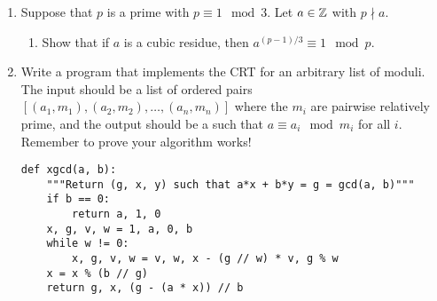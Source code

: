 \documentclass[10pt]{article}
\begin{document}
\begin{enumerate}[itemsep=1em,label=\Alph*.,leftmargin=*]
            \pagebreak
    \item  Suppose that $p$ is a prime with $p \equiv 1 \mod{3}$. Let $a \in \mathbb{Z}$ with $p \nmid a$.
        \begin{enumerate}[label=(\alph*),leftmargin=*]
            \item Show that if $a$ is a cubic residue, then $a^{(p−1)/3} \equiv 1 \mod{p}$. 

            
        
        \end{enumerate}

            \pagebreak
    \item Write a program that implements the CRT for an arbitrary list of moduli.
The input should be a list of ordered pairs $[(a_1,m_1),(a_2,m_2),\ldots,(a_n,m_n)]$
where the $m_i$ are pairwise relatively prime, and the output should be a
        such that $a \equiv a_i \mod{m_i}$ for all $i$. Remember to prove your algorithm works!
\vspace{1em}
                \begin{lstlisting}
def xgcd(a, b):
    """Return (g, x, y) such that a*x + b*y = g = gcd(a, b)"""
    if b == 0:
        return a, 1, 0
    x, g, v, w = 1, a, 0, b
    while w != 0:
        x, g, v, w = v, w, x - (g // w) * v, g % w
    x = x % (b // g)
    return g, x, (g - (a * x)) // b


\end{lstlisting}
\end{enumerate}
\end{document}
